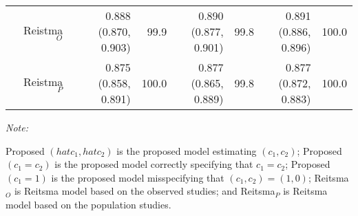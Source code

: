 \begin{table}
\begin{threeparttable}
\begin{tabular}[t]{rrrrrrrrr}
 & Reistma$_O$ &  & 0.888 (0.870, 0.903) & 99.9 & 0.890 (0.877, 0.901) & 99.8 & 0.891 (0.886, 0.896) & 100.0\\
 & Reistma$_P$ &  & 0.875 (0.858, 0.891) & 100.0 & 0.877 (0.865, 0.889) & 99.8 & 0.877 (0.872, 0.883) & 100.0\\
\bottomrule
\end{tabular}
\begin{tablenotes}
\item \textit{Note: } 
\item Proposed $({hat{c}_1, hat{c}_2})$ is the proposed model estimating $(c_1, c_2)$;
   Proposed $(c_1 = c_2)$ is the proposed model correctly specifying that $c_1=c_2$;
   Proposed $(c_1 = 1)$ is the proposed model misspecifying that $(c_1, c_2) = (1,0)$;
   Reitsma$_O$ is Reitsma model based on the observed studies;
   and Reitsma$_P$ is Reitsma model based on the population studies.
\end{tablenotes}
\end{threeparttable}
\end{table}
